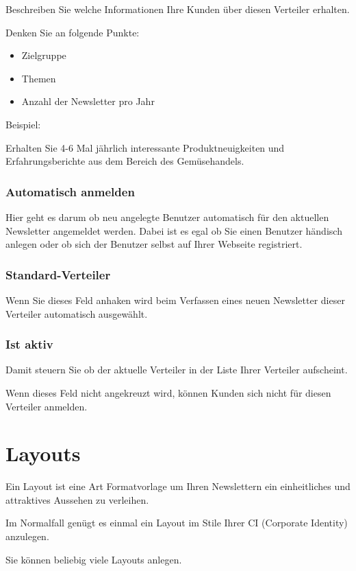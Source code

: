 \documentclass[article, a4paper, oneside, 11pt]{memoir}
\begin{document}
Beschreiben Sie welche Informationen Ihre Kunden über diesen Verteiler erhalten.

Denken Sie an folgende Punkte:
\begin{itemize}
 \item Zielgruppe
 \item Themen
 \item Anzahl der Newsletter pro Jahr
\end{itemize}

Beispiel:  

Erhalten Sie 4-6 Mal jährlich interessante Produktneuigkeiten und Erfahrungsberichte aus dem Bereich des Gemüsehandels.

\subsection{Automatisch anmelden}

Hier geht es darum ob neu angelegte Benutzer automatisch für den aktuellen Newsletter angemeldet werden.
Dabei ist es egal ob Sie einen Benutzer händisch anlegen oder ob sich der Benutzer selbst auf Ihrer Webseite registriert.

\subsection{Standard-Verteiler}

Wenn Sie dieses Feld anhaken wird beim Verfassen eines neuen Newsletter dieser Verteiler automatisch ausgewählt.

\subsection{Ist aktiv}

Damit steuern Sie ob der aktuelle Verteiler in der Liste Ihrer Verteiler aufscheint.

Wenn dieses Feld nicht angekreuzt wird, können Kunden sich nicht für diesen Verteiler anmelden.


\chapter{Layouts}

Ein Layout ist eine Art Formatvorlage um Ihren Newslettern ein einheitliches und attraktives Aussehen zu verleihen.

Im Normalfall genügt es einmal ein Layout im Stile Ihrer CI (Corporate Identity) anzulegen.

Sie können beliebig viele Layouts anlegen.
\end{document}
